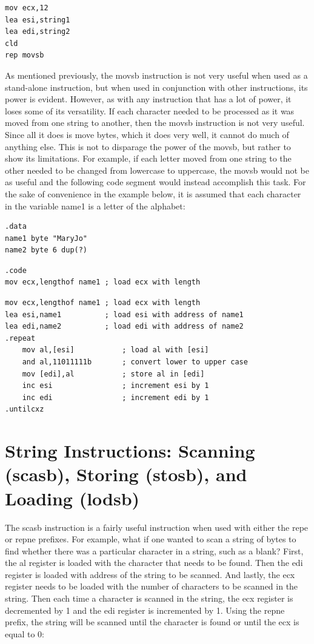 \documentclass[10pt]{book}
\begin{document}
\begin{verbatim}
mov ecx,12
lea esi,string1
lea edi,string2
cld
rep movsb
\end{verbatim}

As mentioned previously, the movsb instruction is not very useful when used as a stand-alone instruction, but when used in conjunction with other instructions, its power is evident. However, as with any instruction that has a lot of power, it loses some of its versatility. If each character needed to be processed as it was moved from one string to another, then the movsb instruction is not very useful. Since all it does is move bytes, which it does very well, it cannot do much of anything else. This is not to disparage the power of the movsb, but rather to show its limitations. For example, if each letter moved from one string to the other needed to be changed from lowercase to uppercase, the movsb would not be as useful and the following code segment would instead accomplish this task. For the sake of convenience in the example below, it is assumed that each character in the variable name1 is a letter of the alphabet:

\begin{verbatim}
.data
name1 byte "MaryJo"
name2 byte 6 dup(?)
\end{verbatim}

\begin{verbatim}
.code
mov ecx,lengthof name1 ; load ecx with length
\end{verbatim}
\begin{verbatim}
mov ecx,lengthof name1 ; load ecx with length
lea esi,name1          ; load esi with address of name1
lea edi,name2          ; load edi with address of name2
.repeat
    mov al,[esi]           ; load al with [esi]
    and al,11011111b       ; convert lower to upper case
    mov [edi],al           ; store al in [edi]
    inc esi                ; increment esi by 1
    inc edi                ; increment edi by 1
.untilcxz
\end{verbatim}

\section{String Instructions: Scanning (scasb), Storing (stosb), and Loading (lodsb)}
The scasb instruction is a fairly useful instruction when used with either the repe or repne prefixes. For example, what if one wanted to scan a string of bytes to find whether there was a particular character in a string, such as a blank? First, the al register is loaded with the character that needs to be found. Then the edi register is loaded with address of the string to be scanned. And lastly, the ecx register needs to be loaded with the number of characters to be scanned in the string. Then each time a character is scanned in the string, the ecx register is decremented by 1 and the edi register is incremented by 1. Using the repne prefix, the string will be scanned until the character is found or until the ecx is equal to 0:
\end{document}

